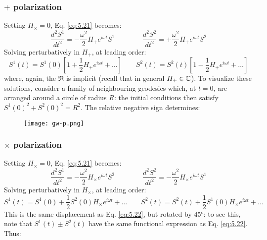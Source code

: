 \subsubsection{$ + $ polarization}

Setting $ H_\times = 0 $, Eq. \ref{eq:5.21} becomes:
\begin{equation*}
  \frac{d^2 S^1}{dt^2} = - \frac{\omega^2}{2} H_+ e^{i \omega t} S^1
  \qquad \qquad
  \frac{d^2 S^2}{dt^2} = + \frac{\omega^2}{2} H_+ e^{i \omega t} S^2
\end{equation*}
Solving perturbatively in $ H_+ $, at leading order:
\begin{equation}
  S^1(t) = S^1(0) \left[ 1 + \frac{1}{2} H_+ e^{i \omega t} + \dots \right]
  \qquad
  S^2(t) = S^2(t) \left[ 1 - \frac{1}{2} H_+ e^{i \omega t} + \dots \right]
  \label{eq:5.22}
\end{equation}
where, again, the $ \Re $ is implicit (recall that in general $ H_+ \in \mathbb{C} $). To visualize these solutions, consider a family of neighbouring geodesics which, at $ t = 0 $, are arranged around a circle of radius $ R $: the initial conditions then satisfy $ S^1(0)^2 + S^2(0)^2 = R^2 $. The relative negative sign determines:

\begin{figure*}[h]
  \centering
  \texttt{[image: gw-p.png]}
\end{figure*}

\subsubsection{$ \times $ polarization}

Setting $ H_\times = 0 $, Eq. \ref{eq:5.21} becomes:
\begin{equation*}
  \frac{d^2 S^1}{dt^2} = - \frac{\omega^2}{2} H_\times e^{i \omega t} S^2
  \qquad \qquad
  \frac{d^2 S^2}{dt^2} = - \frac{\omega^2}{2} H_\times e^{i \omega t} S^1
\end{equation*}
Solving perturbatively in $ H_\times $, at leading order:
\begin{equation}
  S^1(t) = S^1(0) + \frac{1}{2} S^2(0) H_\times e^{i \omega t} + \dots
  \qquad
  S^2(t) = S^2(t) + \frac{1}{2} S^1(0) H_\times e^{i \omega t} + \dots
  \label{eq:5.23}
\end{equation}
This is the same displacement as Eq. \ref{eq:5.22}, but rotated by 45°: to see this, note that $ S^1(t) \pm S^2(t) $ have the same functional expression as Eq. \ref{eq:5.22}. Thus:

